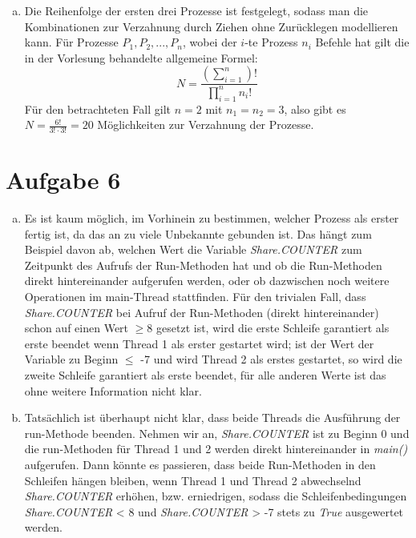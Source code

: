 \documentclass[numbers=noendperiod]{scrartcl}
\begin{document}
\begin{enumerate}[a)]
	\item Die Reihenfolge der ersten drei Prozesse ist festgelegt, sodass man die Kombinationen zur Verzahnung durch Ziehen ohne Zurücklegen modellieren kann. Für Prozesse $P_1, P_2, ..., P_n$, wobei der $i$-te Prozess $n_i$ Befehle hat gilt die in der Vorlesung behandelte allgemeine Formel:
	\begin{equation}
		N = \frac{\left(\sum_{i=1}^{n}\right)!}{\prod_{i=1}^{n}n_i!}
	\end{equation}
	Für den betrachteten Fall gilt $n=2$ mit $n_1 = n_2 = 3$, also gibt es $N = \frac{6!}{3!\cdot 3!} = 20$ Möglichkeiten zur Verzahnung der Prozesse.
\end{enumerate}

\section*{Aufgabe 6}
\begin{enumerate}[a)]
	\item Es ist kaum möglich, im Vorhinein zu bestimmen, welcher Prozess als erster fertig ist, da das an zu viele Unbekannte gebunden ist. Das hängt zum Beispiel davon ab, welchen Wert die Variable \textit{Share.COUNTER} zum Zeitpunkt des Aufrufs der Run-Methoden hat und ob die Run-Methoden direkt hintereinander aufgerufen werden, oder ob dazwischen noch weitere Operationen im main-Thread stattfinden. Für den trivialen Fall, dass \textit{Share.COUNTER} bei Aufruf der Run-Methoden (direkt hintereinander) schon auf einen Wert $\ge$8 gesetzt ist, wird die erste Schleife garantiert als erste beendet wenn Thread 1 als erster gestartet wird; ist der Wert der Variable zu Beginn $\le$ -7 und wird Thread 2 als erstes gestartet, so wird die zweite Schleife garantiert als erste beendet, für alle anderen Werte ist das ohne weitere Information nicht klar.
	
	\item Tatsächlich ist überhaupt nicht klar, dass beide Threads die Ausführung der run-Methode beenden. Nehmen wir an, \textit{Share.COUNTER} ist zu Beginn 0 und die run-Methoden für Thread 1 und 2 werden direkt hintereinander in \textit{main()} aufgerufen. Dann könnte es passieren, dass beide Run-Methoden in den Schleifen hängen bleiben, wenn Thread 1 und Thread 2 abwechselnd \textit{Share.COUNTER} erhöhen, bzw. erniedrigen, sodass die Schleifenbedingungen \textit{Share.COUNTER} < 8 und \textit{Share.COUNTER} > -7 stets zu \textit{True} ausgewertet werden.
\end{enumerate}
\end{document}
